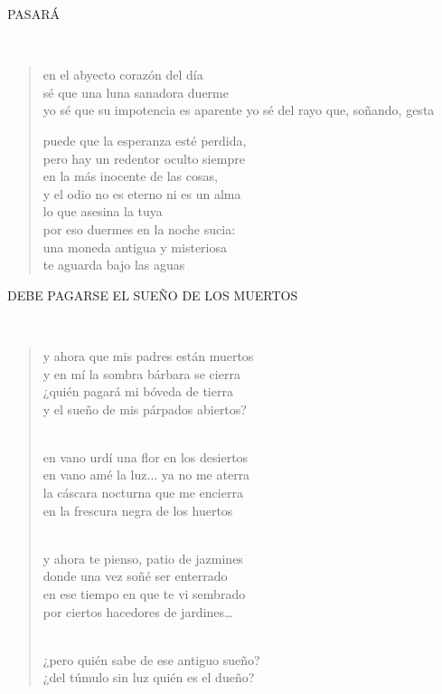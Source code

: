 \documentclass[a4paper, 12pt]{article}
\begin{document}
\pagebreak 
\centerline{PASARÁ}
~

\begin{verse}
    
en el abyecto corazón del día\\
sé que una luna sanadora duerme\\

yo sé que su impotencia es aparente 
yo sé del rayo que, soñando, gesta

puede que la esperanza esté perdida,\\
pero hay un redentor oculto siempre\\
en la más inocente de las cosas,\\
y el odio no es eterno ni es un alma\\
lo que asesina la tuya\\

por eso duermes en la noche sucia:\\
una moneda antigua y misteriosa\\
te aguarda bajo las aguas\\
\end{verse}

\pagebreak 

\centerline{DEBE PAGARSE EL SUEÑO DE LOS MUERTOS}
~ 

\begin{verse}
y ahora que mis padres están muertos\\
y en mí la sombra bárbara se cierra\\
¿quién pagará mi bóveda de tierra\\
y el sueño de mis párpados abiertos?\\
~ 

en vano urdí una flor en los desiertos\\
en vano amé la luz... ya no me aterra\\
la cáscara nocturna que me encierra\\
en la frescura negra de los huertos\\
~ 

y ahora te pienso, patio de jazmines\\
donde una vez soñé ser enterrado\\
en ese tiempo en que te vi sembrado\\
por ciertos hacedores de jardines…\\
~ 

¿pero quién sabe de ese antiguo sueño?\\
¿del túmulo sin luz quién es el dueño?\\
\end{verse}
\end{document}
